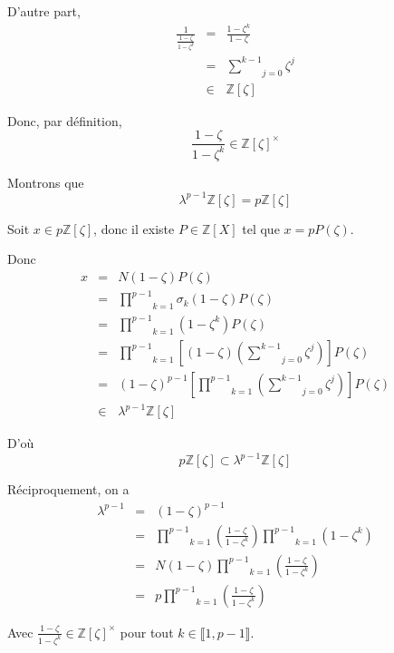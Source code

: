 D'autre part,
\begin{eqnarray*}
  \frac{1}{\frac{1 - \zeta }{1 - \zeta^k}} & = & \frac{1 - \zeta^k}{1 -
  \zeta}\\
  & = & \underset{j = 0}{\overset{k - 1}{\sum}} \zeta^j\\
  & \in & \mathbb{Z} [\zeta]
\end{eqnarray*}


Donc, par d{\'e}finition,
\[ \frac{1 - \zeta}{1 - \zeta^k} \in \mathbb{Z} [\zeta]^{\times} \]


Montrons que
\[ \lambda^{p - 1} \mathbb{Z} [\zeta] = p\mathbb{Z} [\zeta] \]


Soit $x \in p\mathbb{Z} [\zeta]$, donc il existe $P \in \mathbb{Z} [X]$ tel
que $x = p P (\zeta)$.

Donc
\begin{eqnarray*}
  x & = & N (1 - \zeta) P (\zeta)\\
  & = & \underset{k = 1}{\overset{p - 1}{\prod}} \sigma_k (1 - \zeta ) P
  (\zeta)\\
  & = & \underset{k = 1}{\overset{p - 1}{\prod}} (1 - \zeta^k) P (\zeta)\\
  & = & \underset{k = 1}{\overset{p - 1}{\prod}} \left[ (1 - \zeta ) \left(
  \underset{j = 0}{\overset{k - 1}{\sum}} \zeta^j \right) \right] P (\zeta)\\
  & = & (1 - \zeta)^{p - 1} \left[ \underset{k = 1}{\overset{p - 1}{\prod}}
  \left( \underset{j = 0}{\overset{k - 1}{\sum}} \zeta^j \right) \right] P
  (\zeta)\\
  & \in & \lambda^{p - 1} \mathbb{Z} [\zeta]
\end{eqnarray*}


D'o{\`u}
\[ p\mathbb{Z} [\zeta] \subset \lambda^{p - 1} \mathbb{Z} [\zeta] \]


R{\'e}ciproquement, on a
\begin{eqnarray*}
  \lambda^{p - 1} & = & (1 - \zeta)^{p - 1}\\
  & = & \underset{k = 1}{\overset{p - 1}{\prod}} \left( \frac{1 - \zeta}{1 -
  \zeta^k} \right) \underset{k = 1}{\overset{p - 1}{\prod}} (1 - \zeta^k)\\
  & = & N (1 - \zeta) \underset{k = 1}{\overset{p - 1}{\prod}} \left( \frac{1
  - \zeta}{1 - \zeta^k} \right)\\
  & = & p \underset{k = 1}{\overset{p - 1}{\prod}} \left( \frac{1 - \zeta}{1
  - \zeta^k} \right)
\end{eqnarray*}


Avec $\frac{1 - \zeta}{1 - \zeta^k} \in \mathbb{Z} [\zeta]^{\times}$ pour tout
$k \in \llbracket 1, p - 1 \rrbracket$.

